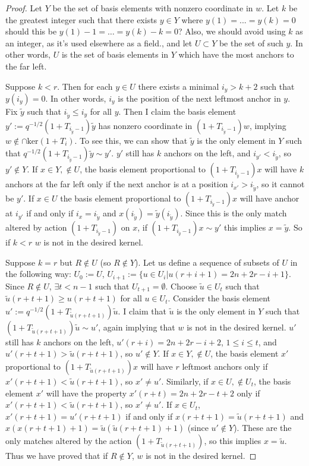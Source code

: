 \documentclass{amsart}
\begin{document}
\begin{proof}
  Let $Y$ be the set of basis elements with nonzero coordinate in $w$. Let $k$ be the greatest integer such that there exists $y\in Y$ where $y(1)=...=y(k)=0$ {\color{magenta} should this be $y(1)-1 = \dots = y(k) - k = 0$? Also, we should avoid using $k$ as an integer, as it's used elsewhere as a field.}, and let $U\subset Y$ be the set of such $y$. In other words, $U$ is the set of basis elements in $Y$ which have the most anchors to the far left.
	
	Suppose $k<r$. Then for each $y\in U$ there exists a minimal $i_y>k+2$ such that $y(i_y)=0$. In other words, $i_y$ is the position of the next leftmost anchor in $y$.  Fix $\tilde{y}$ such that $i_{\tilde{y}}\leq i_y$ for all $y$. Then I claim the basis element $y':=q^{-1/2}(1+T_{i_{\tilde{y}}-1})\tilde{y}$ has nonzero coordinate in $(1+T_{i_{\tilde{y}}-1})w$, implying $w\not\in \cap\text{ker}(1+T_i)$. To see this, we can show that $\tilde{y}$ is the only element in $Y$ such that $q^{-1/2}(1+T_{i_{\tilde{y}}-1})\tilde{y}\sim y'$. $y'$ still has $k$ anchors on the left, and $i_{y'}<i_{\tilde{y}}$, so $y'\not\in Y$. If $x\in Y,\not\in U$, the basis element proportional to $(1+T_{i_{\tilde{y}}-1})x$ will have $k$ anchors at the far left only if the next anchor is at a position $i_{x'}>i_{\tilde{y}}$, so it cannot be $y'$. If $x\in U$ the basis element proportional to $(1+T_{i_{\tilde{y}}-1})x$ will have anchor at $i_{y'}$ if and only if $i_x=i_{\tilde{y}}$ and $x(i_{\tilde{y}})=\tilde{y}(i_{\tilde{y}})$. Since this is the only match altered by action $(1+T_{i_{\tilde{y}}-1})$ on $x$, if $(1+T_{i_{\tilde{y}}-1})x\sim y'$ this implies $x=\tilde{y}$. So if $k<r$ $w$ is not in the desired kernel.
	
	Suppose $k=r$ but $R\not\in U$ (so $R\not\in Y$). Let us define a sequence of subsets of $U$ in the following way: $U_0:=U$, $U_{i+1}:=\{u\in U_i| u(r+i+1)=2n+2r-i+1 \}$. Since $R\not\in U$, $\exists t<n-1$ such that $U_{t+1}=\emptyset$. Choose $\tilde{u}\in U_t$ such that $\tilde{u}(r+t+1)\geq u(r+t+1)$ for all $u\in U_t$. Consider the basis element $u':=q^{-1/2}(1+T_{\tilde{u}(r+t+1)})\tilde{u}$. I claim that $\tilde{u}$ is the only element in $Y$ such that $(1+T_{\tilde{u}(r+t+1)})\tilde{u}\sim u'$, again implying that $w$ is not in the desired kernel. $u'$ still has $k$ anchors on the left, $u'(r+i)=2n+2r-i+2$, $1\leq i\leq t$, and $u'(r+t+1)>\tilde{u}(r+t+1)$, so $u'\not\in Y$. If $x\in Y,\not\in U$,  the basis element $x'$ proportional to $(1+T_{\tilde{u}(r+t+1)})x$ will have $r$ leftmost anchors only if $x'(r+t+1)<\tilde{u}(r+t+1)$, so $x'\not=u'$. Similarly, if $x\in U,\not\in U_t$, the basis element $x'$ will have the property $x'(r+t)=2n+2r-t+2$ only if $x'(r+t+1)<\tilde{u}(r+t+1)$, so $x'\not=u'$. If $x\in U_t$, $x'(r+t+1)=u'(r+t+1)$ if and only if $x(r+t+1)=\tilde{u}(r+t+1)$ and $x(x(r+t+1)+1)=\tilde{u}(\tilde{u}(r+t+1)+1)$ (since $u'\not \in Y$). These are the only matches altered by the action $(1+T_{\tilde{u}(r+t+1)})$, so this implies $x=\tilde{u}$. Thus we have proved that if $R\not\in Y$, $w$ is not in the desired kernel.
	
\end{proof}
\end{document}
